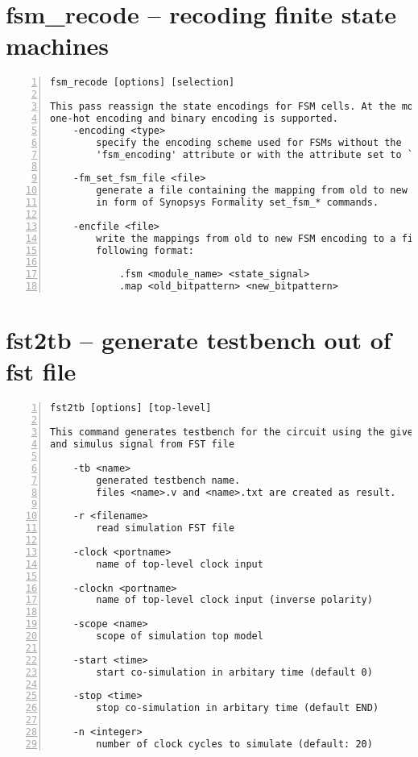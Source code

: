 \section{fsm\_recode -- recoding finite state machines}
\label{cmd:fsm_recode}
\begin{lstlisting}[numbers=left,frame=single]
    fsm_recode [options] [selection]

This pass reassign the state encodings for FSM cells. At the moment only
one-hot encoding and binary encoding is supported.
    -encoding <type>
        specify the encoding scheme used for FSMs without the
        'fsm_encoding' attribute or with the attribute set to `auto'.

    -fm_set_fsm_file <file>
        generate a file containing the mapping from old to new FSM encoding
        in form of Synopsys Formality set_fsm_* commands.

    -encfile <file>
        write the mappings from old to new FSM encoding to a file in the
        following format:

            .fsm <module_name> <state_signal>
            .map <old_bitpattern> <new_bitpattern>
\end{lstlisting}

\section{fst2tb -- generate testbench out of fst file}
\label{cmd:fst2tb}
\begin{lstlisting}[numbers=left,frame=single]
    fst2tb [options] [top-level]

This command generates testbench for the circuit using the given top-level module
and simulus signal from FST file

    -tb <name>
        generated testbench name.
        files <name>.v and <name>.txt are created as result.

    -r <filename>
        read simulation FST file

    -clock <portname>
        name of top-level clock input

    -clockn <portname>
        name of top-level clock input (inverse polarity)

    -scope <name>
        scope of simulation top model

    -start <time>
        start co-simulation in arbitary time (default 0)

    -stop <time>
        stop co-simulation in arbitary time (default END)

    -n <integer>
        number of clock cycles to simulate (default: 20)
\end{lstlisting}

